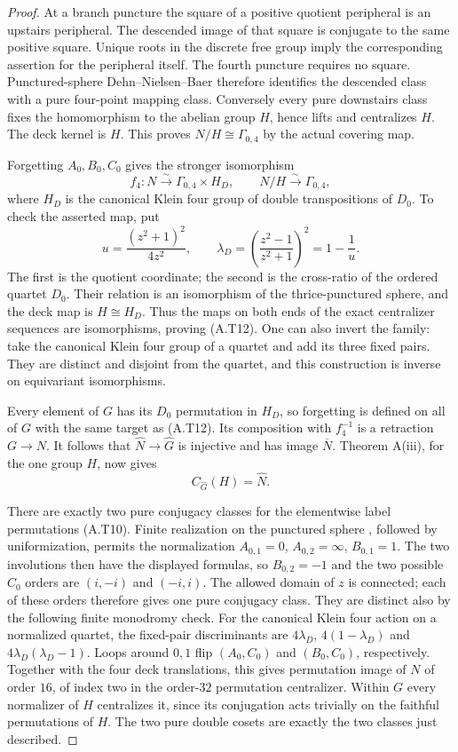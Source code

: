 \begin{proof}
At a branch puncture the square of a positive quotient
peripheral is an upstairs peripheral.  The descended image of
that square is conjugate to the same positive square.  Unique
roots in the discrete free group imply the corresponding
assertion for the peripheral itself.  The fourth puncture
requires no square.  Punctured-sphere Dehn--Nielsen--Baer
therefore identifies the descended class with a pure
four-point mapping class.  Conversely every pure downstairs
class fixes the homomorphism to the abelian group $H$, hence
lifts and centralizes $H$.  The deck kernel is $H$.  This proves
$N/H\cong\Gamma_{0,4}$ by the actual covering map.

Forgetting $A_0,B_0,C_0$ gives the stronger isomorphism
\[
 f_4:N\xrightarrow{\sim}\Gamma_{0,4}\times H_D,
 \qquad N/H\xrightarrow{\sim}\Gamma_{0,4},                 \tag{A.T12}
\]
where $H_D$ is the canonical Klein four group of double
transpositions of $D_0$.  To check the asserted map, put
\[
 u=\frac{(z^2+1)^2}{4z^2},\qquad
 \lambda_D=\left(\frac{z^2-1}{z^2+1}\right)^2=1-\frac1u.
                                                               \tag{A.T13}
\]
The first is the quotient coordinate; the second is the
cross-ratio of the ordered quartet $D_0$.  Their relation is
an isomorphism of the thrice-punctured sphere, and the deck
map is $H\cong H_D$.  Thus the maps on both ends of the exact
centralizer sequences are isomorphisms, proving (A.T12).
One can also invert the family: take the canonical Klein four
group of a quartet and add its three fixed pairs.  They are
distinct and disjoint from the quartet, and this construction
is inverse on equivariant isomorphisms.

Every element of $G$ has its $D_0$ permutation in $H_D$, so
forgetting is defined on all of $G$ with the same target as
(A.T12).  Its composition with $f_4^{-1}$ is a retraction
$G\to N$.  It follows that $\widehat N\to\widehat G$ is
injective and has image $\overline N$.  Theorem A(iii), for
the one group $H$, now gives
\[
                  C_{\widehat G}(H)=\widehat N.             \tag{A.T14}
\]

There are exactly two pure conjugacy classes for the
elementwise label permutations (A.T10).  Finite realization on
the punctured sphere \cite[Theorem 5 and \S IV, pp.~255--256]{CA_Kerckhoff1983},
followed by uniformization, permits the
normalization $A_{0,1}=0$, $A_{0,2}=\infty$, $B_{0,1}=1$.
The two involutions then have the displayed formulas, so
$B_{0,2}=-1$ and the two possible $C_0$ orders are
$(i,-i)$ and $(-i,i)$.  The allowed domain of $z$ is connected;
each of these orders therefore gives one pure conjugacy class.
They are distinct also by the following finite monodromy check.
For the canonical Klein four action on a normalized quartet,
the fixed-pair discriminants are
$4\lambda_D$, $4(1-\lambda_D)$ and
$4\lambda_D(\lambda_D-1)$.  Loops around $0,1$ flip
$(A_0,C_0)$ and $(B_0,C_0)$, respectively.  Together with
the four deck translations, this gives permutation image of
$N$ of order $16$, of index two in the order-$32$ permutation
centralizer.  Within $G$ every normalizer of $H$ centralizes
it, since its conjugation acts trivially on the faithful
permutations of $H$.  The two pure double cosets are exactly
the two classes just described.


\end{proof}
